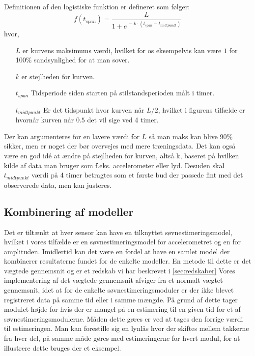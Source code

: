 Definitionen af den logistiske funktion er defineret som følger:
\begin{equation}
	f(t_{span}) = \frac{L}{1+e^{\,-k\cdot(t_{span} - t_{midtpunkt})}}
\end{equation} 
hvor,
\begin{itemize}
	\item[$L$] er kurvens maksimums værdi, hvilket for os eksempelvis kan være $1$ for 100\% sandsynlighed for at man sover.
	\item[$k$] er stejlheden for kurven.
	\item[$t_{span}$] Tidsperiode siden starten på stilstandsperioden målt i timer.
	\item[$t_{midtpunkt}$] Er det tidspunkt hvor kurven når $L/2$, hvilket i figurens tilfælde er hvornår kurven når $0.5$ det vil sige ved 4 timer.
\end{itemize}

Der kan argumenteres for en lavere værdi for $L$ så man maks kan blive 90\% sikker, men er noget der bør overvejes med mere træningsdata. 
Det kan også være en god idé at ændre på stejlheden for kurven, altså k, baseret på hvilken kilde af data man bruger som f.eks. accelerometer eller lyd.
Desuden skal $t_{midtpunkt}$ værdi på 4 timer betragtes som et første bud der passede fint med det observerede data, men kan justeres.

\subsection{Kombinering af modeller}\label{subsec:kombimodeller}
Det er tiltænkt at hver sensor kan have en tilknyttet søvnestimeringsmodel, hvilket i vores tilfælde er en søvnestimeringsmodel for accelerometret og en for amplituden.
Imidlertid kan det være en fordel at have en samlet model der kombinerer resultaterne fundet for de enkelte modeller.
En metode til dette er det vægtede gennemsnit og er et redskab vi har beskrevet i \cref{sec:redskaber}
Vores implementering af det vægtede gennemsnit afviger fra et normalt vægtet gennemsnit, idet at for de enkelte søvnestimeringsmoduler er der ikke blevet registreret data på samme tid eller i samme mængde.
På grund af dette tager modulet højde for hvis der er mangel på en estimering til en given tid for et af søvnestimeringsmodulerne.
Måden dette gøres er ved at tages den forrige værdi til estimeringen.
Man kan forestille sig en lynlås hvor der skiftes mellem takkerne fra hver del, på samme måde gøres med estimeringerne for hvert modul, for at illustrere dette bruges der et eksempel.

